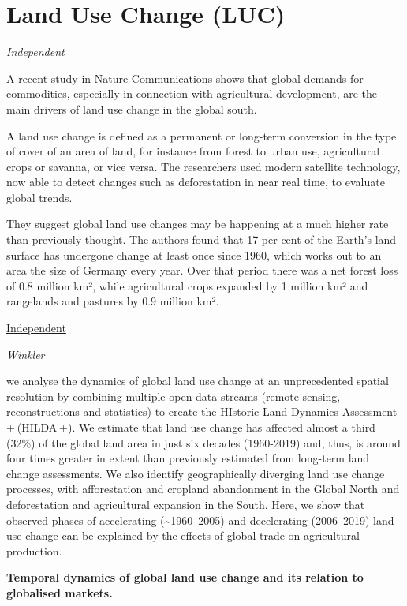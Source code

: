\documentclass[
]{book}
\begin{document}
\hypertarget{land-use-change-luc}{%
\section{Land Use Change (LUC)}\label{land-use-change-luc}}

\emph{Independent}

A recent study in Nature Communications shows that global demands for commodities, especially in connection with agricultural development, are the main drivers of land use change in the global south.

A land use change is defined as a permanent or long-term conversion in the type of cover of an area of land, for instance from forest to urban use, agricultural crops or savanna, or vice versa. The researchers used modern satellite technology, now able to detect changes such as deforestation in near real time, to evaluate global trends.

They suggest global land use changes may be happening at a much higher rate than previously thought. The authors found that 17 per cent of the Earth's land surface has undergone change at least once since 1960, which works out to an area the size of Germany every year. Over that period there was a net forest loss of 0.8 million km², while agricultural crops expanded by 1 million km² and rangelands and pastures by 0.9 million km².

\href{https://www.independent.co.uk/news/science/cause-deforestation-world-global-markets-b1865516.html}{Independent}

\emph{Winkler}

we analyse the dynamics of global land use change at an unprecedented spatial resolution by combining multiple open data streams (remote sensing, reconstructions and statistics) to create the HIstoric Land Dynamics Assessment + (HILDA +). We estimate that land use change has affected almost a third (32\%) of the global land area in just six decades (1960-2019) and, thus, is around four times greater in extent than previously estimated from long-term land change assessments. We also identify geographically diverging land use change processes, with afforestation and cropland abandonment in the Global North and deforestation and agricultural expansion in the South. Here, we show that observed phases of accelerating (\textasciitilde1960--2005) and decelerating (2006--2019) land use change can be explained by the effects of global trade on agricultural production.

\textbf{Temporal dynamics of global land use change and its relation
to globalised markets.}
\end{document}
